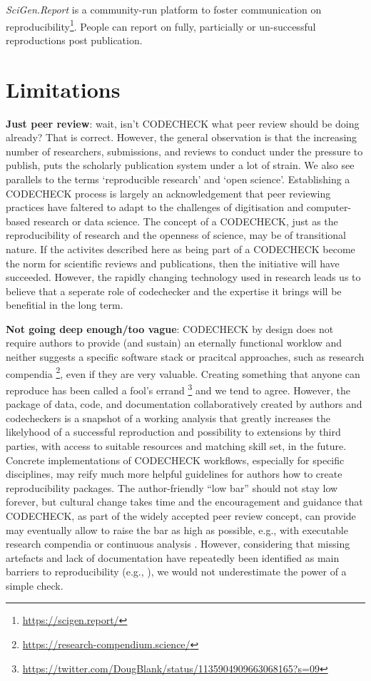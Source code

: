 \documentclass[12pt]{article}
\begin{document}
\emph{SciGen.Report} is a community-run platform to foster communication on
reproducibility\footnote{\url{https://scigen.report/}}. People can report on
fully, particially or un-successful reproductions post publication.

\section*{Limitations}\label{limitations}

\textbf{Just peer review}: wait, isn't CODECHECK what peer review should be 
doing already? That is correct.
However, the general observation is that the increasing
number of researchers, submissions, and reviews to conduct under the
pressure to publish, puts the scholarly publication system under a lot
of strain.  We also see parallels to the terms 
`reproducible research' and `open science'. Establishing a CODECHECK 
process is largely an acknowledgement that peer reviewing practices 
have faltered to adapt to the challenges of digitisation and computer-based
research or data science. The concept of a CODECHECK, just as the 
reproducibility of research and the openness of science, may be of 
transitional nature. If the activites described here as being part of a 
CODECHECK become the norm for scientific reviews and publications, then
the initiative will have succeeded.
However, the rapidly changing technology used in research leads us to 
believe that a seperate role of codechecker and the expertise it brings
will be benefitial in the long term.

\textbf{Not going deep enough/too vague}:
CODECHECK by design does not require authors to provide (and sustain) an
eternally functional worklow and neither suggests a specific software stack
or pracitcal approaches, such as research compendia
\footnote{\url{https://research-compendium.science/}},
even if they are very valuable.
Creating something that anyone can reproduce has been called a 
fool's errand
\footnote{\url{https://twitter.com/DougBlank/status/1135904909663068165?s=09}}
and we tend to agree.
However, the package of data, code, and documentation
collaboratively created by authors and codecheckers is a snapshot of a 
working analysis that greatly increases the likelyhood of a successful 
reproduction and possibility to extensions by third parties, with access
to suitable resources and matching skill set, in the future.
Concrete implementations of CODECHECK workflows, especially for specific
disciplines, may reify much more helpful guidelines for authors how to
create reproducibility packages.
The author-friendly ``low bar'' should not stay low forever, but cultural
change takes time and the encouragement and guidance that CODECHECK,
as part of the widely accepted peer review concept, can provide may
eventually allow to raise the bar as high as possible, e.g., with
executable research compendia \cite{nust_opening_2017}
or continuous analysis \cite{beaulieu-jones_reproducibility_2017-1}.
However, considering that missing artefacts and lack of documentation
have repeatedly been identified as main barriers to reproducibility
(e.g., \cite{stagge_assessing_2019,nust_improving_2020}),
we would not underestimate the power of a simple check.
\end{document}
